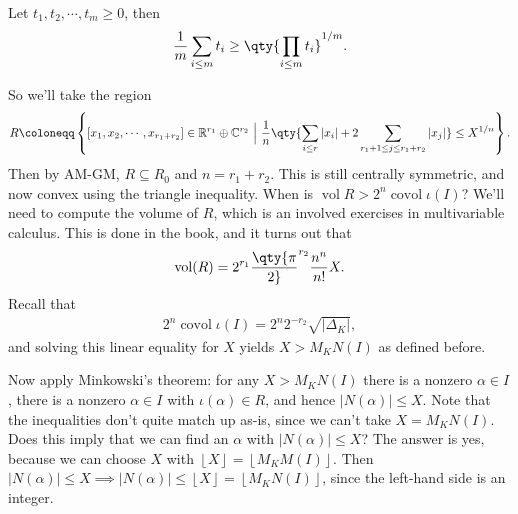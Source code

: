 \begin{proposition}[AM-GM Inequality]

Let \({ {t}_1, {t}_2, \cdots, {t}_{m}} \geq 0\), then
\begin{align*}
{1\over m} \sum_{i\leq m} t_i \geq \qty{ \prod_{i\leq m} t_i }^{1/m}
.\end{align*}

\end{proposition}

\begin{remark}

So we'll take the region
\begin{align*}
R \coloneqq\left\{{ {\left[ {{ {x}_1, {x}_2, \cdots, {x}_{r_1 + r_2}}} \right]} \in {\mathbb{R}}^{r_1} \oplus {\mathbb{C}}^{r_2} {~\mathrel{\Big|}~}
{1\over n} \qty{ \sum_{i\leq r} {\left\lvert {x_i} \right\rvert} + 2\sum_{r_1 + 1 \leq j \leq r_1 + r_2 } {\left\lvert {x_j} \right\rvert} } \leq X^{1/n}
}\right\} 
.\end{align*}
Then by AM-GM, \(R \subseteq R_0\) and \(n= r_1 + r_2\). This is still
centrally symmetric, and now convex using the triangle inequality. When
is \(\operatorname{vol}R > 2^n \operatorname{covol}\iota(I)\)? We'll
need to compute the volume of \(R\), which is an involved exercises in
multivariable calculus. This is done in the book, and it turns out that
\begin{align*}
\operatorname{vol}(R) = 2^{r_1} \qty{\pi \over 2}^{r_2} {n^n \over n!} X
.\end{align*}
Recall that
\begin{align*}
2^n \operatorname{covol}\iota(I) = 2^n 2^{-r_2} \sqrt{{\left\lvert {{\Delta}_K} \right\rvert}}
,\end{align*}
and solving this linear equality for \(X\) yields \(X > M_K N(I)\) as
defined before.

Now apply Minkowski's theorem: for any \(X > M_K N(I)\) there is a
nonzero \(\alpha\in I\), there is a nonzero \(\alpha\in I\) with
\(\iota( \alpha)\in R\), and hence
\({\left\lvert {N( \alpha)} \right\rvert} \leq X\). Note that the
inequalities don't quite match up as-is, since we can't take
\(X = M_K N(I)\). Does this imply that we can find an \(\alpha\) with
\({\left\lvert {N( \alpha)} \right\rvert} \leq X\)? The answer is yes,
because we can choose \(X\) with
\({\left\lfloor X \right\rfloor} = {\left\lfloor M_K M(I) \right\rfloor}\).
Then
\({\left\lvert {N( \alpha)} \right\rvert} \leq X \implies {\left\lvert {N( \alpha)} \right\rvert} \leq {\left\lfloor X \right\rfloor} = {\left\lfloor M_K N(I) \right\rfloor}\),
since the left-hand side is an integer.

\end{remark}

